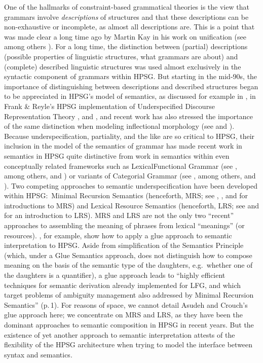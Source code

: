 \documentclass[output=paper,biblatex,babelshorthands,newtxmath,draftmode,colorlinks,citecolor=brown]{langscibook}
\begin{document}
\largerpage
\enlargethispage{3pt}
One of the hallmarks of constraint-based grammatical theories is the view that grammars involve
\emph{descriptions} of structures and that these descriptions can be non-exhaustive or incomplete,
as almost all descriptions are. This is a point that was made clear a long time ago by Martin Kay
in his work on unification (see among others \citealt{Kay1979}). For a long time, the distinction
between (partial) descriptions (possible properties of linguistic structures, what grammars are
about) and (complete) described linguistic structures was used almost exclusively in the syntactic
component of grammars within HPSG. But starting in the mid-90s, the importance of distinguishing
between descriptions and described structures began to be appreciated in HPSG's model of semantics,
as discussed for example in \citet{Nerbonne1993a}, in Frank \& Reyle's HPSG implementation of
Underspecified Discourse Representation Theory \citep{FrankandReyle1992,FrankandReyle1995}, and
\citet*{Copestakeetal1995}, and recent work has also stressed the importance of the same distinction
when modeling inflectional morphology (see \citealt{CrysmannandBonami2016} and
). Because underspecification,
partiality, and the like are so critical to HPSG, their inclusion in the model of the semantics of
grammar has made recent work in semantics in HPSG quite distinctive from work in semantics within
even conceptually related frameworks such as Lexical\indexlfg Functional Grammar (see
\citealt{BK82a}, among others, and ) or variants of Categorial\indexcg
Grammar (see \citealt{Steedman1996}, among others, and ). Two competing
approaches to semantic underspecification have been developed within HPSG:\ Minimal Recursion
Semantics (henceforth, MRS; see \citealt{Copestakeetal1995}, \citealt{Copestakeetal2001}, and
\citealt{Copestakeetal2005} for introductions to MRS) and Lexical Resource Semantics (henceforth,
LRS; see \citealt{RichterandSailer2004,RichterandSailer2001} and
\citealt{IordachioaiaandRichter2015} for an introduction to LRS). MRS and LRS are not the only two
``recent'' approaches to assembling the meaning of phrases from lexical ``meanings'' (or
resources). \citet{AsudehandCrouch2002}, for example, show how to apply a glue approach to semantic
interpretation to HPSG. Aside from simplification of the Semantics Principle (which, under a Glue
Semantics approach, does not distinguish how to compose meaning on the basis of the semantic type of
the daughters, e.g.\ whether one of the daughters is a quantifier), a glue approach leads to
``highly efficient techniques for semantic derivation already implemented for LFG, and which target
problems of ambiguity management also addressed by Minimal Recursion Semantics'' (p.\,1). For
reasons of space, we cannot detail Asudeh and Crouch's glue approach here; we concentrate on MRS and
LRS, as they have been the dominant approaches to semantic composition in HPSG in recent years. But
the existence of yet another approach to semantic interpretation attests of the flexibility of the
HPSG architecture when trying to model the interface between syntax and semantics.
\largerpage
\end{document}
